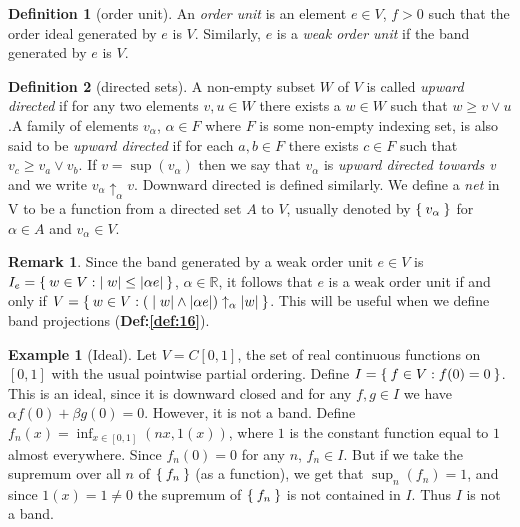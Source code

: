 \documentclass[letterpaper,10pt,oneside,onecolumn,reqno]{amsart}
\newcommand{\R}{\mathbb R}
\theoremstyle{definition}
\newtheorem{defn}{Definition}
\newtheorem{rem}{Remark}
\newtheorem{exa}{Example}
\newcommand{\meet}{\wedge}
\newcommand{\join}{\vee}
\begin{document}
\begin{framed}
  \begin{defn}[order unit]\label{def:10}
    An \emph{order unit} is an element $e \in V$, $f
    > 0$ such that the order ideal generated by $e$ is $V$. Similarly,
    $e$ is a \emph{weak order unit} if the band
    generated by $e$ is $V$.
  \end{defn}
  \begin{defn}[directed sets]\label{def:11}
    A non-empty subset $W$ of $V$ is called \emph{upward directed} if for any two elements $v,u \in W$
    there exists a $w \in W$ such that $w \geq v \join u$.A family of
    elements $v_{\alpha}$, $\alpha \in F$ where $F$ is some non-empty
    indexing set, is also said to be \emph{upward directed} if for
    each $a,b \in F$ there exists $c \in F$ such that $v_c \geq v_a
    \join v_b$. If $v = \sup({v_\alpha})$ then we say that
    $v_{\alpha}$ is \emph{upward directed towards v} and we write
    $v_{\alpha}\uparrow_{\alpha} v$. Downward directed is defined
    similarly. We define a \emph{net} in V to be a function from a
    directed set $A$ to $V$, usually denoted by $\Set{v_{\alpha}}$ for
    $\alpha \in A$ and $v_{\alpha} \in V$. 
    \begin{rem}\label{rem:2}
      Since the band generated by a weak order unit $e \in V$ is
      $I_{e} = \Set{w \in V: |w| \leq |\alpha e|}$, $\alpha \in \R$,
      it follows that $e$ is a weak order unit if and only if $V =
      \Set{w \in V : (|w| \meet |\alpha e|) \uparrow_{\alpha}
        |w|}$. This will be useful when we define band projections
      (\textbf{Def:\ref{def:16}}).
    \end{rem}
  \end{defn}
\end{framed}

\begin{exa}[Ideal]\label{exa:1}
  Let $V=C[0,1]$, the set of real continuous functions on $[0,1]$ with
  the usual pointwise partial ordering. Define $I = \Set{f \in V :
    f(0) = 0}$. This is an ideal, since it is downward closed and for
  any $f,g \in I$ we have $\alpha f(0) + \beta g(0) = 0$. However, it
  is not a band. Define $f_n(x) = \inf_{x \in [0,1]}(nx, 1(x))$, where
  $1$ is the constant function equal to $1$ almost everywhere. Since
  $f_n(0) = 0$ for any $n$, $f_n \in I$. But if we take the supremum
  over all $n$ of $\Set{f_n}$ (as a function), we get that
  $\sup_n({f_n}) = 1$, and since $1(x) = 1 \neq 0$ the supremum of
  $\Set{f_n}$ is not contained in $I$. Thus $I$ is not a band.
\end{exa}
\end{document}
